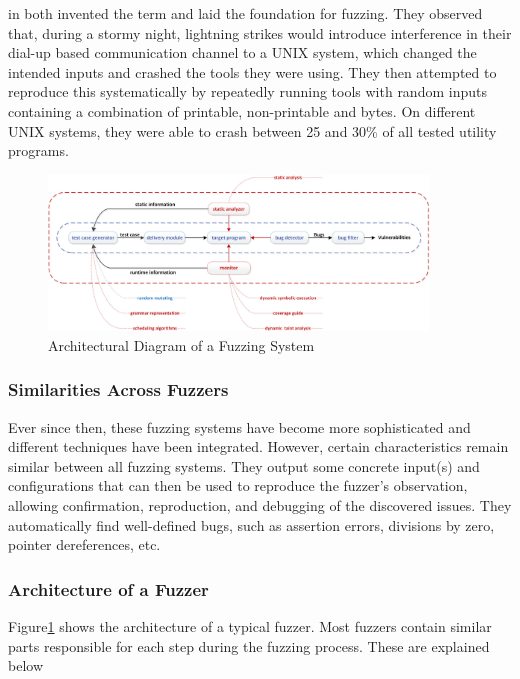 \documentclass{article}
\begin{document}
\begin{multicols}{2}
    \citeauthor{UNIX} in \citeyear{UNIX} both invented the term and laid the foundation for fuzzing. They observed that, during a stormy night, lightning strikes would introduce interference in their dial-up based communication channel to a UNIX system, which changed the intended inputs and crashed the tools they were using. They then attempted to reproduce this systematically by repeatedly running tools with random inputs containing a combination of printable, non-printable and  bytes. On different UNIX systems, they were able to crash between 25 and 30\% of all tested utility programs.\cite{UNIX}

    \begin{figure}[!tp]
        \centering
        \includegraphics[width=0.9\textwidth]{assets/FuzzingSteps.jpg}
        \caption{Architectural Diagram of a Fuzzing System\cite{Science}}
        \label{fig:FuzzingSteps}
    \end{figure}

    \subsubsection{Similarities Across Fuzzers}
    Ever since then, these fuzzing systems have become more sophisticated and different techniques have been integrated. However, certain characteristics remain similar between all fuzzing systems. They output some concrete input(s) and configurations that can then be used to reproduce the fuzzer's observation, allowing confirmation, reproduction, and debugging of the discovered issues.\cite{EvaluatingFuzzTesting} They automatically find well-defined bugs, such as assertion errors, divisions by zero,  pointer dereferences, etc.\cite{AllYouEverWanted}

    \subsubsection{Architecture of a Fuzzer}
    \label{ArchitectureFuzzer}
    Figure\ref{fig:FuzzingSteps} shows the architecture of a typical fuzzer. Most fuzzers contain similar parts responsible for each step during the fuzzing process. These are explained below


\end{multicols}
\end{document}
